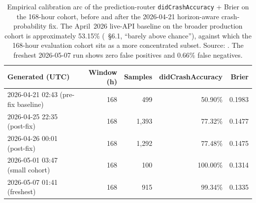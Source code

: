 \documentclass[11pt,a4paper]{article}
\begin{document}
\begin{table}[h]
\centering
\small
\begin{tabular}{lrrrr}
\toprule
\textbf{Generated (UTC)} & \textbf{Window (h)} & \textbf{Samples} &
\textbf{didCrashAccuracy} & \textbf{Brier} \\
\midrule
2026-04-21 02:43 (pre-fix baseline) &  168 &  499 & 50.90\% & 0.1983 \\
2026-04-25 22:35 (post-fix)         &  168 & 1{,}393 & 77.32\% & 0.1477 \\
2026-04-26 00:01 (post-fix)         &  168 & 1{,}292 & 77.48\% & 0.1475 \\
2026-05-01 03:47 (small cohort)     &  168 &  100 & 100.00\% & 0.1314 \\
2026-05-07 01:41 (freshest)         &  168 &  915 & 99.34\% & 0.1335 \\
\bottomrule
\end{tabular}
\caption{Empirical calibration arc of the prediction-router \texttt{didCrashAccuracy}
+ Brier on the 168-hour cohort, before and after the 2026-04-21 horizon-aware
crash-probability fix. The April~2026 live-API baseline on the broader
production cohort is approximately 53.15\% (\cite{omnirisk2026systemdesign}~§6.1,
``barely above chance''), against which the 168-hour evaluation cohort sits as
a more concentrated subset. Source: \cite{omnirisk2026predmetrics}. The
freshest 2026-05-07 run shows zero false positives and 0.66\% false negatives.}
\label{tab:prediction-router}
\end{table}
\end{document}
